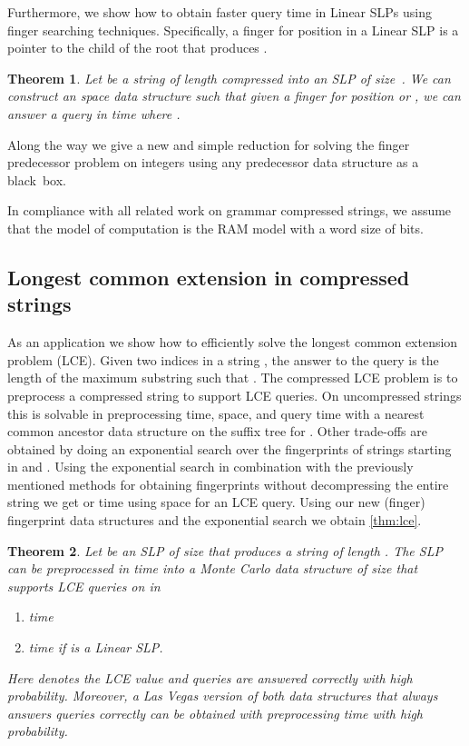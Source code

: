 \documentclass[11pt]{article}
\newtheorem{theorem}{Theorem}
\begin{document}
Furthermore, we show how to obtain faster query time in Linear SLPs using finger searching techniques. Specifically, a finger for position  in a Linear SLP is a pointer to the child of the root that produces .



\begin{theorem}\label{thm:ffp}
Let  be a string of length  compressed into an SLP  of size~. We can construct an  space data structure such that given a finger  for position  or , we can answer a  query in time  where .
\end{theorem}

\noindent Along the way we give a new and simple reduction for solving the finger predecessor problem on integers using any predecessor data structure as a black~box.





In compliance with all related work on grammar compressed strings, we assume that the model of computation is the RAM model with a word size of  bits.




\subsection{Longest common extension in compressed strings}
As an application we show how to efficiently solve the longest common extension problem (LCE).
Given two indices  in a string , the answer to the  query is the length  of the maximum substring such that . The compressed LCE problem is to preprocess a compressed string to support LCE queries. On uncompressed strings this is solvable in  preprocessing time,  space, and  query time with a nearest common ancestor data structure on the suffix tree for  \cite{HT1984}. Other trade-offs are obtained by doing an exponential search over the fingerprints of strings starting in  and  \cite{bille12lce}. Using the exponential search in combination with the previously mentioned methods for obtaining fingerprints without decompressing the entire string we get  or  time using  space for an LCE query. Using our new (finger) fingerprint data structures and the exponential search we obtain \autoref{thm:lce}.

\begin{theorem}\label{thm:lce}
Let  be an SLP of size  that produces a string  of length . The SLP  can be preprocessed in  time into a Monte Carlo data structure of size  that supports LCE queries on  in
\begin{enumerate}
\item[(i)]  time
\item[(ii)]  time if  is a Linear SLP.
\end{enumerate}
Here  denotes the LCE value and queries are answered correctly with high probability. Moreover, a Las Vegas version of both data structures that always answers queries correctly can be obtained with
 preprocessing time with high probability.
\end{theorem}
\end{document}
